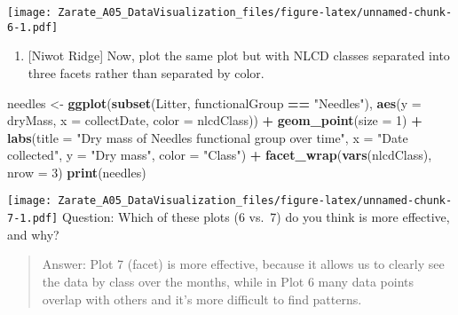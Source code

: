 \documentclass[
]{article}
\newenvironment{Shaded}{\begin{snugshade}}{\end{snugshade}}
\newcommand{\DataTypeTok}[1]{\textcolor[rgb]{0.13,0.29,0.53}{#1}}
\newcommand{\DecValTok}[1]{\textcolor[rgb]{0.00,0.00,0.81}{#1}}
\newcommand{\KeywordTok}[1]{\textcolor[rgb]{0.13,0.29,0.53}{\textbf{#1}}}
\newcommand{\NormalTok}[1]{#1}
\newcommand{\OperatorTok}[1]{\textcolor[rgb]{0.81,0.36,0.00}{\textbf{#1}}}
\newcommand{\StringTok}[1]{\textcolor[rgb]{0.31,0.60,0.02}{#1}}
\providecommand{\tightlist}{%
  \setlength{\itemsep}{0pt}\setlength{\parskip}{0pt}}
\begin{document}
\texttt{[image: Zarate\_A05\_DataVisualization\_files/figure-latex/unnamed-chunk-6-1.pdf]}

\begin{enumerate}
\def\labelenumi{\arabic{enumi}.}
\setcounter{enumi}{6}
\tightlist
\item
  {[}Niwot Ridge{]} Now, plot the same plot but with NLCD classes
  separated into three facets rather than separated by color.
\end{enumerate}

\begin{Shaded}
\begin{Highlighting}[]
\NormalTok{needles <-}\StringTok{ }\KeywordTok{ggplot}\NormalTok{(}\KeywordTok{subset}\NormalTok{(Litter, functionalGroup }\OperatorTok{==}\StringTok{ "Needles"}\NormalTok{),}
                \KeywordTok{aes}\NormalTok{(}\DataTypeTok{y =}\NormalTok{ dryMass, }\DataTypeTok{x =}\NormalTok{ collectDate, }\DataTypeTok{color =}\NormalTok{ nlcdClass)) }\OperatorTok{+}
\StringTok{  }\KeywordTok{geom_point}\NormalTok{(}\DataTypeTok{size =} \DecValTok{1}\NormalTok{) }\OperatorTok{+}
\StringTok{  }\KeywordTok{labs}\NormalTok{(}\DataTypeTok{title =} \StringTok{"Dry mass of Needles functional group over time"}\NormalTok{,}
       \DataTypeTok{x =} \StringTok{"Date collected"}\NormalTok{, }\DataTypeTok{y =} \StringTok{"Dry mass"}\NormalTok{, }\DataTypeTok{color =} \StringTok{"Class"}\NormalTok{) }\OperatorTok{+}
\StringTok{  }\KeywordTok{facet_wrap}\NormalTok{(}\KeywordTok{vars}\NormalTok{(nlcdClass), }\DataTypeTok{nrow =} \DecValTok{3}\NormalTok{) }
\KeywordTok{print}\NormalTok{(needles)}
\end{Highlighting}
\end{Shaded}

\texttt{[image: Zarate\_A05\_DataVisualization\_files/figure-latex/unnamed-chunk-7-1.pdf]}
Question: Which of these plots (6 vs.~7) do you think is more effective,
and why?

\begin{quote}
Answer: Plot 7 (facet) is more effective, because it allows us to
clearly see the data by class over the months, while in Plot 6 many data
points overlap with others and it's more difficult to find patterns.
\end{quote}
\end{document}
